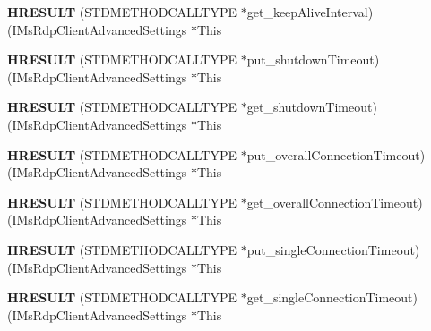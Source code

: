 \begin{DoxyCompactItemize}
{\bfseries H\+R\+E\+S\+U\+LT} (S\+T\+D\+M\+E\+T\+H\+O\+D\+C\+A\+L\+L\+T\+Y\+PE $\ast$get\+\_\+keep\+Alive\+Interval)(I\+Ms\+Rdp\+Client\+Advanced\+Settings $\ast$This
\item 
\mbox{\label{struct_i_ms_rdp_client_advanced_settings_vtbl_a126b6f86e60f74e29763a6042300fb63}} 
{\bfseries H\+R\+E\+S\+U\+LT} (S\+T\+D\+M\+E\+T\+H\+O\+D\+C\+A\+L\+L\+T\+Y\+PE $\ast$put\+\_\+shutdown\+Timeout)(I\+Ms\+Rdp\+Client\+Advanced\+Settings $\ast$This
\item 
\mbox{\label{struct_i_ms_rdp_client_advanced_settings_vtbl_a9eefe03f0d66e3a2942a8e7f610a3ec2}} 
{\bfseries H\+R\+E\+S\+U\+LT} (S\+T\+D\+M\+E\+T\+H\+O\+D\+C\+A\+L\+L\+T\+Y\+PE $\ast$get\+\_\+shutdown\+Timeout)(I\+Ms\+Rdp\+Client\+Advanced\+Settings $\ast$This
\item 
\mbox{\label{struct_i_ms_rdp_client_advanced_settings_vtbl_a1f4c23b6d390a5e58c1c8264a9f68850}} 
{\bfseries H\+R\+E\+S\+U\+LT} (S\+T\+D\+M\+E\+T\+H\+O\+D\+C\+A\+L\+L\+T\+Y\+PE $\ast$put\+\_\+overall\+Connection\+Timeout)(I\+Ms\+Rdp\+Client\+Advanced\+Settings $\ast$This
\item 
\mbox{\label{struct_i_ms_rdp_client_advanced_settings_vtbl_aec5b0b0e8627b9e07e30945d11f65297}} 
{\bfseries H\+R\+E\+S\+U\+LT} (S\+T\+D\+M\+E\+T\+H\+O\+D\+C\+A\+L\+L\+T\+Y\+PE $\ast$get\+\_\+overall\+Connection\+Timeout)(I\+Ms\+Rdp\+Client\+Advanced\+Settings $\ast$This
\item 
\mbox{\label{struct_i_ms_rdp_client_advanced_settings_vtbl_a25ef8e1e040166f077cf028b31e03e39}} 
{\bfseries H\+R\+E\+S\+U\+LT} (S\+T\+D\+M\+E\+T\+H\+O\+D\+C\+A\+L\+L\+T\+Y\+PE $\ast$put\+\_\+single\+Connection\+Timeout)(I\+Ms\+Rdp\+Client\+Advanced\+Settings $\ast$This
\item 
\mbox{\label{struct_i_ms_rdp_client_advanced_settings_vtbl_a4507d209d7618710a9224e44555db917}} 
{\bfseries H\+R\+E\+S\+U\+LT} (S\+T\+D\+M\+E\+T\+H\+O\+D\+C\+A\+L\+L\+T\+Y\+PE $\ast$get\+\_\+single\+Connection\+Timeout)(I\+Ms\+Rdp\+Client\+Advanced\+Settings $\ast$This

\end{DoxyCompactItemize}
